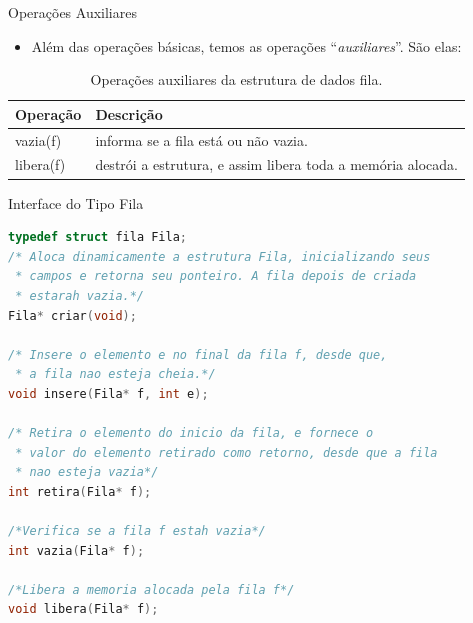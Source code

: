 \begin{frame}{Operações Auxiliares}   
			\begin{itemize}
				\item Além das operações básicas, temos as operações ``\textit{auxiliares}''. São elas:
			\end{itemize}
			\begin{table}[ht]
			  \centering
						\begin{tabular}{l||l}
						    \hline  \hline 
						    \textbf{Operação} & \textbf{Descrição} \\						    
						    \hline  \hline 
						    vazia(f) & informa se a fila está ou não vazia.\\
						    \hline libera(f) & destrói a estrutura, e assim libera toda a memória alocada.\\
						    \hline \hline 
						\end{tabular}
						\caption{Operações auxiliares da estrutura de dados fila.}
				\end{table}
  \end{frame}

\begin{frame}{Interface do Tipo Fila}
\footnotesize
\begin{lstlisting}[language=C]
typedef struct fila Fila;
/* Aloca dinamicamente a estrutura Fila, inicializando seus
 * campos e retorna seu ponteiro. A fila depois de criada
 * estarah vazia.*/
Fila* criar(void);

/* Insere o elemento e no final da fila f, desde que,
 * a fila nao esteja cheia.*/
void insere(Fila* f, int e);

/* Retira o elemento do inicio da fila, e fornece o 
 * valor do elemento retirado como retorno, desde que a fila
 * nao esteja vazia*/
int retira(Fila* f);

/*Verifica se a fila f estah vazia*/
int vazia(Fila* f);

/*Libera a memoria alocada pela fila f*/
void libera(Fila* f);
\end{lstlisting}

\end{frame}


